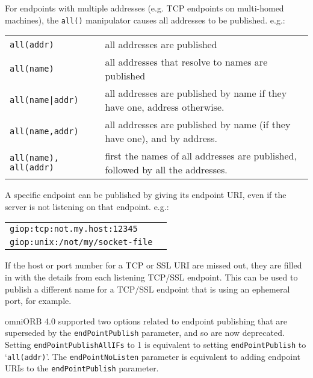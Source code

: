 \documentclass[11pt,twoside,a4paper]{book}
\newcommand{\code}[1]{\texttt{#1}}
\begin{document}
\vspace{\baselineskip}

\noindent
For endpoints with multiple addresses (e.g. TCP endpoints on
multi-homed machines), the \code{all()} manipulator causes all
addresses to be published. e.g.:

\vspace{\baselineskip}

\begin{tabular}{p{}p{}}
\code{all(addr)} & all addresses are published\\
\code{all(name)} & all addresses that resolve to names are published\\
\code{all(name|addr)} & all addresses are published by name if they have
                        one, address otherwise.\\
\code{all(name,addr)} & all addresses are published by name (if they
                        have one), and by address.\\
\code{all(name), all(addr)} & first the names of all addresses are published,
                             followed by all the addresses.\\
\end{tabular}

\vspace{\baselineskip}

\noindent
A specific endpoint can be published by giving its endpoint URI,
even if the server is not listening on that endpoint. e.g.:

\vspace{\baselineskip}

\begin{tabular}{p{}p{}}
\code{giop:tcp:not.my.host:12345}\\
\code{giop:unix:/not/my/socket-file}\\
\end{tabular}

\vspace{\baselineskip}

\noindent
If the host or port number for a TCP or SSL URI are missed out,
they are filled in with the details from each listening TCP/SSL
endpoint. This can be used to publish a different name for a
TCP/SSL endpoint that is using an ephemeral port, for example.

omniORB 4.0 supported two options related to endpoint publishing that
are superseded by the \code{endPointPublish} parameter, and so are now
deprecated. Setting \code{endPointPublishAllIFs} to 1 is equivalent to
setting \code{endPointPublish} to `\code{all(addr)}'. The
\code{endPointNoListen} parameter is equivalent to adding endpoint
URIs to the \code{endPointPublish} parameter.
\end{document}
